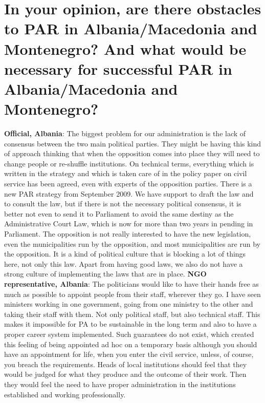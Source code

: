 \section{In your opinion, are there obstacles to PAR in Albania/Macedonia and Montenegro? And what would be necessary for successful PAR in Albania/Macedonia and Montenegro? }
\textbf{Official, Albania}: The biggest problem for our administration is the lack of consensus between the two main political parties. They might be having this kind of approach thinking that when the opposition comes into place they will need to change people or re-shuffle institutions. On technical terms, everything which is written in the strategy and which is taken care of in the policy paper on civil service has been agreed, even with experts of the opposition parties. There is a new PAR strategy from September 2009. We have support to draft the law and to consult the law, but if there is not the necessary political consensus, it is better not even to send it to Parliament to avoid the same destiny as the Administrative Court Law, which is now for more than two years in pending in Parliament. The opposition is not really interested to have the new legislation, even the municipalities run by the opposition, and most municipalities are run by the opposition. It is a kind of political culture that is blocking a lot of things here, not only this law. Apart from having good laws, we also do not have a strong culture of implementing the laws that are in place.
\textbf{NGO representative, Albania}: The politicians would like to have their hands free as much as possible to appoint people from their staff, wherever they go. I have seen ministers working in one government, going from one ministry to the other and taking their staff with them. Not only political staff, but also technical staff. This makes it impossible for PA to be sustainable in the long term and also to have a proper career system implemented. Such guarantees do not exist, which created this feeling of being appointed ad hoc on a temporary basis although you should have an appointment for life, when you enter the civil service, unless, of course, you breach the requirements. Heads of local institutions should feel that they would be judged for what they produce and the outcome of their work. Then they would feel the need to have proper administration in the institutions established and working professionally. 
